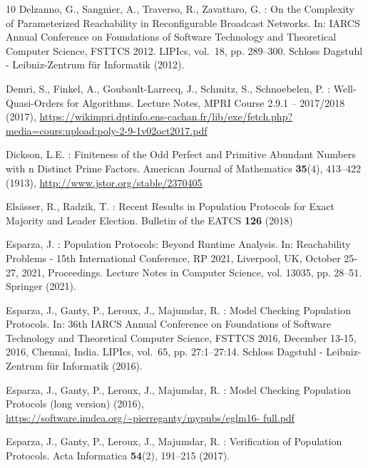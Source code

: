 \documentclass[10pt,a4paper]{article}
\begin{document}
\begin{thebibliography}{10}
	Delzanno, G., Sangnier, A., Traverso, R., Zavattaro, G.
	: {On the Complexity of Parameterized Reachability in Reconfigurable Broadcast Networks}.
	In: {IARCS} Annual Conference on Foundations of Software Technology and Theoretical Computer Science, {FSTTCS} 2012.
	LIPIcs, vol.~18, pp.
	289--300.
	Schloss Dagstuhl - Leibniz-Zentrum f{\"{u}}r Informatik (2012).

	 Demri, S., Finkel, A., Goubault-Larrecq, J., Schmitz, S., Schnoebelen, P.
	: {Well-Quasi-Orders for Algorithms}.
	Lecture Notes, MPRI Course 2.9.1 – 2017/2018 (2017), \url{https://wikimpri.dptinfo.ens-cachan.fr/lib/exe/fetch.php?
		media=cours:upload:poly-2-9-1v02oct2017.pdf}

	Dickson, L.E.
	: {Finiteness of the Odd Perfect and Primitive Abundant Numbers with n Distinct Prime Factors}.
	American Journal of Mathematics \textbf{35}(4), 413--422 (1913), \url{http://www.jstor.org/stable/2370405}

	 Els{\"{a}}sser, R., Radzik, T.
	: {Recent Results in Population Protocols for Exact Majority and Leader Election}.
	Bulletin of the {EATCS} \textbf{126} (2018)

	 Esparza, J.
	: {Population Protocols: Beyond Runtime Analysis}.
	In: Reachability Problems - 15th International Conference, {RP} 2021, Liverpool, UK, October 25-27, 2021, Proceedings.
	Lecture Notes in Computer Science, vol.
	13035, pp. 28--51.
	Springer (2021).

	Esparza, J., Ganty, P., Leroux, J., Majumdar, R.
	: {Model Checking Population Protocols}.
	In: 36th {IARCS} Annual Conference on Foundations of Software Technology and Theoretical Computer Science, {FSTTCS} 2016, December 13-15, 2016, Chennai, India.
	LIPIcs, vol.~65, pp.
	27:1--27:14.
	Schloss Dagstuhl - Leibniz-Zentrum f{\"{u}}r Informatik (2016).

	 Esparza, J., Ganty, P., Leroux, J., Majumdar, R.
	: {Model Checking Population Protocols (long version)}  (2016), \url{https://software.imdea.org/~pierreganty/mypubs/eglm16- full.pdf}

	Esparza, J., Ganty, P., Leroux, J., Majumdar, R.
	: {Verification of Population Protocols}.
	Acta Informatica \textbf{54}(2), 191--215 (2017).


\end{thebibliography}
\end{document}
